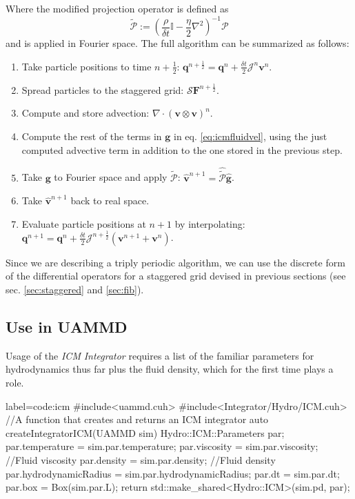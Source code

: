 \documentclass[ twoside,openright,titlepage,numbers=noenddot,%
headinclude,footinclude,cleardoublepage=empty,abstract=on,
BCOR=5mm,paper=a4,fontsize=11pt, dvipsnames
]{scrreprt}
\renewcommand{\vec}[1]{\bm{#1}}
\newcommand{\oper}[1]{\mathcal{#1}}
\newcommand{\dt}{\delta t}
\newcommand{\half}{\frac{1}{2}}
\newcommand{\fou}[1]{\widehat{#1}}
\newcommand{\ppos}{q}
\newcommand{\fvel}{v}
\begin{document}
Where the modified projection operator is defined as
\begin{equation}
  \tilde{\oper{P}} :=\left(\frac{\rho}{\dt}\mathbb{I} - \frac{\eta}{2}\nabla^2\right)^{-1}\oper{P}
\end{equation}
and is applied in Fourier space.
The full algorithm can be summarized as follows:
\begin{enumerate}
\item Take particle positions to time $n+\half$: $\vec{\ppos}^{n+\half} = \vec{\ppos}^n + \frac{\dt}{2}\oper{J}^n\vec{\fvel}^n$.
\item Spread particles to the staggered grid: $\oper{S}\vec{F}^{n+\half}$.
\item Compute and store advection: $\nabla\cdot (\vec{\fvel}\otimes\vec{\fvel})^n$.
\item Compute the rest of the terms in $\vec{g}$ in eq. \eqref{eq:icmfluidvel}, using the just computed advective term in addition to the one stored in the previous step.
\item Take $\vec{g}$ to Fourier space and apply $\tilde{\oper{P}}$: $\fou{\vec{\fvel}}^{n+1} = \fou{\tilde{\oper{P}}}\fou{\vec{g}}$.
\item Take $\fou{\vec{\fvel}}^{n+1}$ back to real space.
\item Evaluate particle positions at $n+1$ by interpolating: $\vec{\ppos}^{n+1} = \vec{\ppos}^n + \frac{\dt}{2}\oper{J}^{n+\half}\left(\vec{\fvel}^{n+1} + \vec{\fvel}^{n}\right)$.
\end{enumerate}
Since we are describing a triply periodic algorithm, we can use the discrete form of the differential operators for a staggered grid devised in previous sections (see sec. \ref{sec:staggered} and \ref{sec:fib}).


\subsection*{Use in UAMMD}
Usage of the \emph{ICM} \emph{Integrator} requires a list of the familiar parameters for hydrodynamics thus far plus the fluid density, which for the first time plays a role.

\begin{code2}{label=code:icm}
#include<uammd.cuh>
#include<Integrator/Hydro/ICM.cuh>
//A function that creates and returns an ICM integrator
auto createIntegratorICM(UAMMD sim){
  Hydro::ICM::Parameters par;
  par.temperature = sim.par.temperature;
  par.viscosity = sim.par.viscosity; //Fluid viscosity
  par.density = sim.par.density;   //Fluid density
  par.hydrodynamicRadius = sim.par.hydrodynamicRadius;
  par.dt = sim.par.dt;
  par.box = Box(sim.par.L);
  return std::make_shared<Hydro::ICM>(sim.pd, par);
}
\end{code2}
\end{document}
